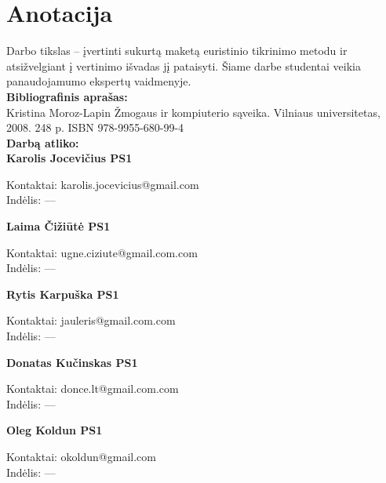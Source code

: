 

\newcommand{\anotacijaIndelis}[3]{
	\textbf{#1}
	\begin{flushleft}
	\hspace*{1cm}
	Kontaktai: #2
	\\
	\hspace*{1cm}
	Indėlis: #3
	\end{flushleft}
}

\newcommand{\anotacija}[2]{
	\textbf{#1}
	\begin{flushleft}
	\hspace*{1cm}
	Kontaktai: #2
	\end{flushleft}
}

\section*{Anotacija}

		Darbo tikslas – įvertinti sukurtą maketą euristinio tikrinimo metodu ir atsižvelgiant į vertinimo išvadas jį pataisyti. 
		Šiame darbe studentai veikia panaudojamumo ekspertų vaidmenyje. \\
		
		\textbf{Bibliografinis aprašas:}\\
		Kristina Moroz-Lapin Žmogaus ir kompiuterio sąveika. Vilniaus universitetas, 2008. 248 p. ISBN 978-9955-680-99-4
		\\
		
		\textbf{Darbą atliko:}\\

		\anotacijaIndelis{Karolis Jocevičius PS1}{karolis.jocevicius@gmail.com}{---}
		
		\anotacijaIndelis{Laima Čižiūtė PS1}{ugne.ciziute@gmail.com.com}{---}
		
		\anotacijaIndelis{Rytis Karpuška PS1}{jauleris@gmail.com.com}{---}

		\anotacijaIndelis{Donatas Kučinskas PS1}{donce.lt@gmail.com.com}{---}

		\anotacijaIndelis{Oleg Koldun PS1}{okoldun@gmail.com}{---}